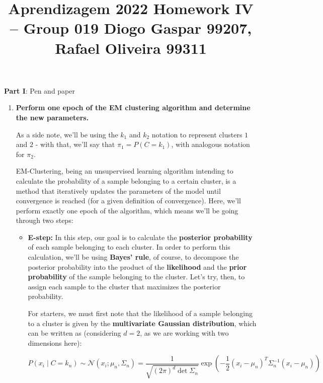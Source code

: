 \documentclass[12pt]{article}
\title{\large{Aprendizagem 2022}\vskip 0.2cm Homework IV -- Group 019\vskip 0.2cm Diogo Gaspar 99207, Rafael Oliveira 99311}
\date{}
\begin{document}
\maketitle
\center\large{\vskip -2.5cm\textbf{Part I}: Pen and paper}
\begin{enumerate}[leftmargin=\labelsep]

  \item \textbf{Perform one epoch of the EM clustering algorithm and determine the new parameters.}

        As a side note, we'll be using the $k_1$ and $k_2$ notation to represent
        clusters $1$ and $2$ - with that, we'll say that $\pi_1 = P(C = k_1)$,
        with analogous notation for $\pi_2$.

        EM-Clustering, being an unsupervised learning algorithm intending to calculate
        the probability of a sample belonging to a certain cluster, is a method that
        iteratively updates the parameters of the model until convergence is reached
        (for a given definition of convergence). Here, we'll perform exactly one
        epoch of the algorithm, which means we'll be going through two steps:

        \begin{itemize}[leftmargin=]
          \item \textbf{E-step:} In this step, our goal is to calculate the \textbf{posterior
                  probability} of each sample belonging to each cluster.
                In order to perform this calculation, we'll be using \textbf{Bayes' rule},
                of course, to decompose the posterior probability into the product of
                the \textbf{likelihood} and the \textbf{prior probability} of the sample
                belonging to the cluster. Let's try, then, to assign each sample to
                the cluster that maximizes the posterior probability.

                For starters, we must first note that the likelihood of a sample
                belonging to a cluster is given by the \textbf{multivariate Gaussian
                  distribution}, which can be written as (considering $d = 2$, as we
                are working with two dimensions here):

                \begin{equation*}
                  P(x_i \mid C = k_n) \sim \mathcal{N}(x_i; \mu_n, \Sigma_n) = \frac{1}{\sqrt{(2\pi)^d \det \Sigma_n}}
                  \exp \left( -\frac{1}{2} (x_i - \mu_n)^T \Sigma_n^{-1} (x_i - \mu_n) \right)
                \end{equation*}


\end{itemize}
\end{enumerate}
\end{document}
